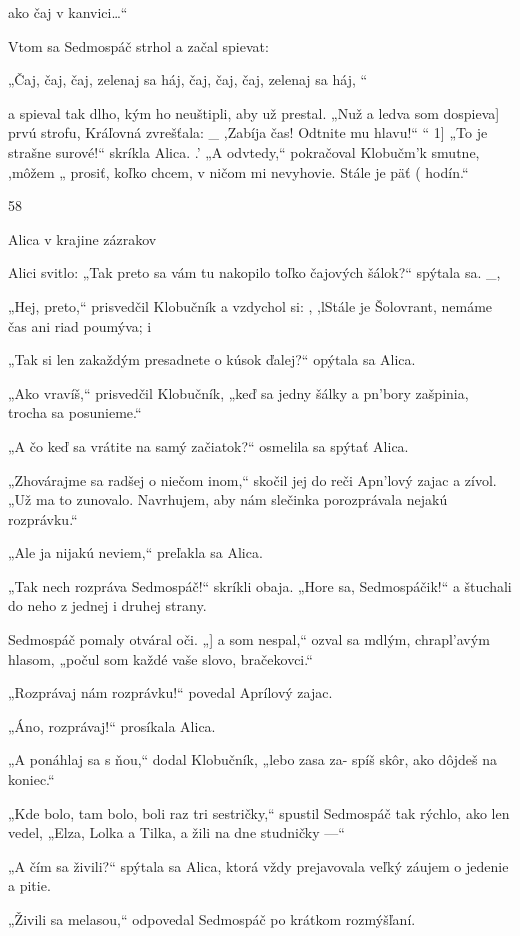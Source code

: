 \documentclass[12pt]{article}
\begin{document}
\begin{Parallel}[p]{}{}
{{ako čaj v kanvici…“

Vtom sa Sedmospáč strhol a začal spievat:

„Čaj, čaj, čaj, zelenaj sa háj,
čaj, čaj, čaj, zelenaj sa háj, “

a spieval tak dlho, kým ho neuštipli, aby už prestal.
„Nuž a ledva som dospieva] prvú strofu, Kráľovná
zvrešťala:
_ ,Zabíja čas! Odtnite mu hlavu!“ “
1] „To je strašne surové!“ skríkla Alica.
.' „A odvtedy,“ pokračoval Klobučm'k smutne, ,môžem
„ prosiť, koľko chcem, v ničom mi nevyhovie. Stále je päť
( hodín.“

58

Alica v krajine zázrakov

Alici svitlo: „Tak preto sa vám tu nakopilo toľko čajových
šálok?“ spýtala sa. _,

„Hej, preto,“ prisvedčil Klobučník a vzdychol si: , ,lStále je
Šolovrant, nemáme čas ani riad poumýva; i

„Tak si len zakaždým presadnete o kúsok ďalej?“ opýtala
sa Alica.

„Ako vravíš,“ prisvedčil Klobučník, „keď sa jedny šálky
a pn'bory zašpinia, trocha sa posunieme.“

„A čo keď sa vrátite na samý začiatok?“ osmelila sa spýtať
Alica.

„Zhovárajme sa radšej o niečom inom,“ skočil jej do reči
Apn'lový zajac a zívol. „Už ma to zunovalo. Navrhujem, aby
nám slečinka porozprávala nejakú rozprávku.“

„Ale ja nijakú neviem,“ preľakla sa Alica.

„Tak nech rozpráva Sedmospáč!“ skríkli obaja. „Hore
sa, Sedmospáčik!“ a štuchali do neho z jednej i druhej
strany.

Sedmospáč pomaly otváral oči. „] a som nespal,“ ozval sa
mdlým, chrapl'avým hlasom, „počul som každé vaše slovo,
bračekovci.“

„Rozprávaj nám rozprávku!“ povedal Aprílový zajac.

„Áno, rozprávaj!“ prosíkala Alica.

„A ponáhlaj sa s ňou,“ dodal Klobučník, „lebo zasa za-
spíš skôr, ako dôjdeš na koniec.“

„Kde bolo, tam bolo, boli raz tri sestričky,“ spustil
Sedmospáč tak rýchlo, ako len vedel, „Elza, Lolka a Tilka,
a žili na dne studničky —“

„A čím sa živili?“ spýtala sa Alica, ktorá vždy prejavovala
veľký záujem o jedenie a pitie.

„Živili sa melasou,“ odpovedal Sedmospáč po krátkom
rozmýšľaní.

}}
\end{Parallel}
\end{document}
